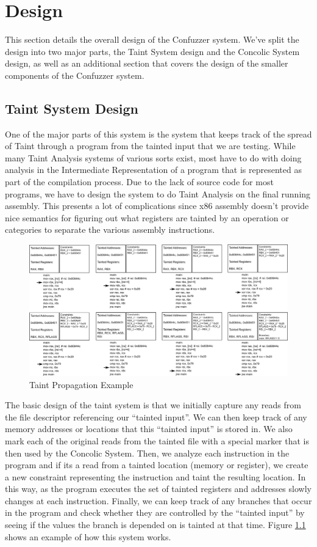 \chapter{Design}
This section details the overall design of the Confuzzer system. We've split the
design into two major parts, the Taint System design and the Concolic System
design, as well as an additional section that covers the design of the smaller
components of the Confuzzer system.

\section{Taint System Design}
One of the major parts of this system is the system that keeps track of the
spread of Taint through a program from the tainted input that we are
testing. While many Taint Analysis systems of various sorts exist, most have to
do with doing analysis in the Intermediate Representation of a program that is
represented as part of the compilation process. Due to the lack of source code
for most programs, we have to design the system to do Taint Analysis on the
final running assembly. This presents a lot of complications since x86 assembly
doesn't provide nice semantics for figuring out what registers are tainted by an
operation or categories to separate the various assembly instructions.

\begin{figure}[htbp]
 \centering
 \includegraphics{taintprop}
 \caption{Taint Propagation Example}
 \label{figure:taintprop}
\end{figure}

The basic design of the taint system is that we initially capture any reads from
the file descriptor referencing our ``tainted input''. We can then keep track of
any memory addresses or locations that this ``tainted input'' is stored
in. We also mark each of the original reads from the tainted file with a special
marker that is then used by the Concolic System. Then, we analyze each
instruction in the program and if its a read from a tainted location (memory or
register), we create a new constraint representing the instruction and taint the
resulting location. In this way, as the program executes the set of tainted
registers and addresses slowly changes at each instruction. Finally, we can keep
track of any branches that occur in the program and check whether they are
controlled by the ``tainted input'' by seeing if the values the branch is
depended on is tainted at that time. Figure \ref{figure:taintprop} shows an
example of how this system works.

